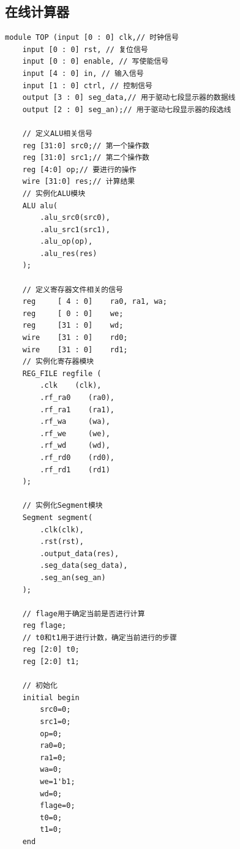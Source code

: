 \documentclass[12pt,a4paper]{ctexart}
\begin{document}
\subsection{在线计算器}
\begin{lstlisting}[style=verilog]
module TOP (input [0 : 0] clk,// 时钟信号
    input [0 : 0] rst, // 复位信号
    input [0 : 0] enable, // 写使能信号
    input [4 : 0] in, // 输入信号
    input [1 : 0] ctrl, // 控制信号
    output [3 : 0] seg_data,// 用于驱动七段显示器的数据线
    output [2 : 0] seg_an);// 用于驱动七段显示器的段选线

    // 定义ALU相关信号
    reg [31:0] src0;// 第一个操作数
    reg [31:0] src1;// 第二个操作数
    reg [4:0] op;// 要进行的操作
    wire [31:0] res;// 计算结果
    // 实例化ALU模块
    ALU alu(
        .alu_src0(src0),
        .alu_src1(src1),
        .alu_op(op),
        .alu_res(res)
    );

    // 定义寄存器文件相关的信号
    reg     [ 4 : 0]    ra0, ra1, wa;
    reg     [ 0 : 0]    we;
    reg     [31 : 0]    wd;
    wire    [31 : 0]    rd0;
    wire    [31 : 0]    rd1;
    // 实例化寄存器模块
    REG_FILE regfile (
        .clk    (clk),
        .rf_ra0    (ra0),
        .rf_ra1    (ra1),
        .rf_wa     (wa),
        .rf_we     (we),
        .rf_wd     (wd),
        .rf_rd0    (rd0),
        .rf_rd1    (rd1)
    );

    // 实例化Segment模块
    Segment segment(
        .clk(clk),
        .rst(rst),
        .output_data(res),
        .seg_data(seg_data),
        .seg_an(seg_an)
    );

    // flage用于确定当前是否进行计算
    reg flage;
    // t0和t1用于进行计数，确定当前进行的步骤
    reg [2:0] t0;
    reg [2:0] t1;

    // 初始化
    initial begin
        src0=0;
        src1=0;
        op=0;
        ra0=0;
        ra1=0;
        wa=0;
        we=1'b1;
        wd=0;
        flage=0;
        t0=0;
        t1=0;
    end


\end{lstlisting}
\end{document}
